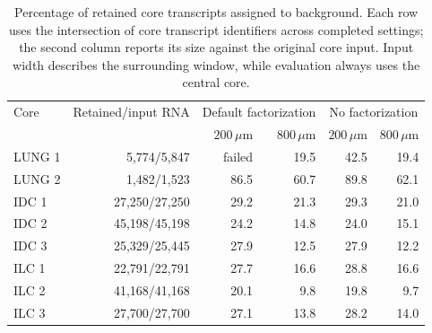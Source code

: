 \begin{table}[ht]\centering
\begin{tabular}{lrrrrr}\toprule
Core&Retained/input RNA&\multicolumn{2}{c}{Default factorization}&\multicolumn{2}{c}{No factorization}\\
&&$200\,\mu\mathrm m$&$800\,\mu\mathrm m$&$200\,\mu\mathrm m$&$800\,\mu\mathrm m$\\\midrule
LUNG 1&5,774/5,847&failed&19.5&42.5&19.4\\
LUNG 2&1,482/1,523&86.5&60.7&89.8&62.1\\
IDC 1&27,250/27,250&29.2&21.3&29.3&21.0\\
IDC 2&45,198/45,198&24.2&14.8&24.0&15.1\\
IDC 3&25,329/25,445&27.9&12.5&27.9&12.2\\
ILC 1&22,791/22,791&27.7&16.6&28.8&16.6\\
ILC 2&41,168/41,168&20.1&9.8&19.8&9.7\\
ILC 3&27,700/27,700&27.1&13.8&28.2&14.0\\
\bottomrule\end{tabular}
\caption{Percentage of retained core transcripts assigned to background. Each row uses the intersection of core transcript identifiers across completed settings; the second column reports its size against the original core input. Input width describes the surrounding window, while evaluation always uses the central core.}\label{tab:context-background}
\end{table}
